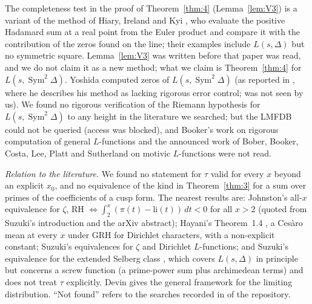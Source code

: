 \documentclass[11pt]{amsart}
\theoremstyle{definition}
\numberwithin{equation}{section}
\newcommand{\Sym}{\operatorname{Sym}^2}
\begin{document}
The completeness test in the proof of Theorem~\ref{thm:4} (Lemma~\ref{lem:V3}) is a variant of the method of Hiary, Ireland and Kyi \cite{HIK}, who evaluate the positive Hadamard sum at a real point from the Euler product and compare it with the contribution of the zeros found on the line; their examples include $L(s,\Delta)$ but no symmetric square. Lemma~\ref{lem:V3} was written before that paper was read, and we do not claim it as a new method; what we claim is Theorem~\ref{thm:4} for $L(s,\Sym\Delta)$. Yoshida \cite{Yoshida88} computed zeros of $L(s,\Sym\Delta)$ (as reported in \cite{Yoshida95}, where he describes his method as lacking rigorous error control; \cite{Yoshida88} was not seen by us). We found no rigorous verification of the Riemann hypothesis for $L(s,\Sym\Delta)$ to any height in the literature we searched; but the LMFDB could not be queried (access was blocked), and Booker's work on rigorous computation of general $L$-functions \cite{Booker} and the announced work of Bober, Booker, Costa, Lee, Platt and Sutherland on motivic $L$-functions were not read.

\emph{Relation to the literature.} We found no statement for $\tau$ valid for every $x$ beyond an explicit $x_0$, and no equivalence of the kind in Theorem~\ref{thm:3} for a sum over primes of the coefficients of a cusp form. The nearest results are: Johnston's all-$x$ equivalence for $\zeta$, RH $\iff\int_2^x(\pi(t)-\mathrm{li}(t))\,dt<0$ for all $x>2$ \cite{Johnston} (quoted from Suzuki's introduction and the arXiv abstract); Hayani's Theorem~1.4 \cite{Hayani}, a Ces\`aro mean at every $x$ under GRH for Dirichlet characters, with a non-explicit constant; Suzuki's equivalences \cite{Suzuki1} for $\zeta$ and Dirichlet $L$-functions; and Suzuki's equivalence for the extended Selberg class \cite{Suzuki2}, which covers $L(s,\Delta)$ in principle but concerns a screw function (a prime-power sum plus archimedean terms) and does not treat $\tau$ explicitly. Devin \cite{Devin} gives the general framework for the limiting distribution. ``Not found'' refers to the searches recorded in  of the repository.
\end{document}
